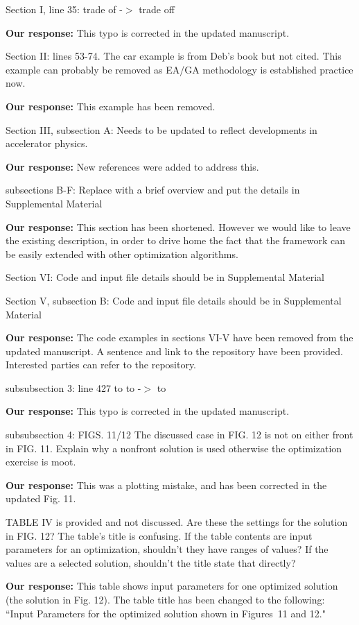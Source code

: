 \documentclass{article}
\begin{document}
Section I, line 35: trade of -$>$ trade off

{\bf Our response:} {\color{blue} This typo is corrected in the updated manuscript.}

Section II:
lines 53-74. The car example is from Deb’s book but not cited. This
example can probably be removed as EA/GA methodology is established
practice now.

{\bf Our response:} {\color{blue} This example has been removed.}

Section III, subsection A:
Needs to be updated to reflect developments in accelerator physics.

{\bf Our response:} {\color{blue} New references were added to address this.}

subsections B-F:
Replace with a brief overview and put the details in Supplemental
Material

{\bf Our response: } {\color{blue} This section has been shortened. However we would like to 
leave the existing description, in order to drive home the fact that the framework can be 
easily extended with other optimization algorithms.}

Section VI: 
Code and input file details should be in Supplemental Material

Section V, subsection B:
Code and input file details should be in Supplemental Material

{\bf Our response:} {\color{blue} The code examples in sections VI-V have been removed from the updated manuscript. 
	A sentence and link to the repository have been provided. Interested parties can refer to the repository.}

subsubsection 3:
line 427 to to -$>$ to

{\bf Our response:} {\color{blue} This typo is corrected in the updated manuscript.}

subsubsection 4:
FIGS. 11/12 The discussed case in FIG. 12 is not on either front in
FIG. 11. Explain why a nonfront solution is used otherwise the
optimization exercise is moot.

{\bf Our response:} {\color{blue} This was a plotting mistake, and has been corrected in the updated Fig. 11.}

TABLE IV is provided and not discussed. Are these the settings for the
solution in FIG. 12? The table’s title is confusing. If the table
contents are input parameters for an optimization, shouldn’t they have
ranges of values? If the values are a selected solution, shouldn’t the
title state that directly?

{\bf Our response:} {\color{blue} This table shows input parameters for one optimized solution (the solution in Fig. 12). 
The table title has been changed to the following: ``Input Parameters for the optimized solution shown in Figures~11 and 12."}


 
\end{document}
